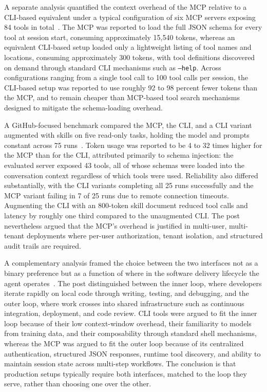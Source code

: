 \documentclass[
english,                 %
bibtex,                  %
includeExtraAbstracts, %
]{kththesis}
\numberwithin{listing}{chapter}
\begin{document}
A separate analysis quantified the context overhead of the \gls{MCP} relative to a \gls{CLI}-based equivalent under a typical configuration of six \gls{MCP} servers exposing 84 tools in total~\cite{yilmaz_i_2026}. The \gls{MCP} was reported to load the full \gls{JSON} schema for every tool at session start, consuming approximately 15,540 tokens, whereas an equivalent \gls{CLI}-based setup loaded only a lightweight listing of tool names and locations, consuming approximately 300 tokens, with tool definitions discovered on demand through standard \gls{CLI} mechanisms such as \texttt{--help}. Across configurations ranging from a single tool call to 100 tool calls per session, the \gls{CLI}-based setup was reported to use roughly 92 to 98 percent fewer tokens than the \gls{MCP}, and to remain cheaper than \gls{MCP}-based tool search mechanisms designed to mitigate the schema-loading overhead.

A GitHub-focused benchmark compared the \gls{MCP}, the \gls{CLI}, and a \gls{CLI} variant augmented with skills on five read-only tasks, holding the model and prompts constant across 75 runs~\cite{madabhushi_mcp_2026}. Token usage was reported to be 4 to 32 times higher for the \gls{MCP} than for the \gls{CLI}, attributed primarily to schema injection: the evaluated server exposed 43 tools, all of whose schemas were loaded into the conversation context regardless of which tools were used. Reliability also differed substantially, with the \gls{CLI} variants completing all 25 runs successfully and the \gls{MCP} variant failing in 7 of 25 runs due to remote connection timeouts. Augmenting the \gls{CLI} with an 800-token skill document reduced tool calls and latency by roughly one third compared to the unaugmented \gls{CLI}. The post nevertheless argued that the \gls{MCP}'s overhead is justified in multi-user, multi-tenant deployments where per-user authorization, tenant isolation, and structured audit trails are required.

A complementary analysis framed the choice between the two interfaces not as a binary preference but as a function of where in the software delivery lifecycle the agent operates~\cite{schmitt_mcp_2026}. The post distinguished between the inner loop, where developers iterate rapidly on local code through writing, testing, and debugging, and the outer loop, where work crosses into shared infrastructure such as continuous integration, deployment, and code review. \gls{CLI} tools were argued to fit the inner loop because of their low context-window overhead, their familiarity to models from training data, and their composability through standard shell mechanisms, whereas the \gls{MCP} was argued to fit the outer loop because of its centralized authentication, structured \gls{JSON} responses, runtime tool discovery, and ability to maintain session state across multi-step workflows. The conclusion is that production setups typically require both interfaces, matched to the loop they serve, rather than choosing one over the other.
\end{document}
